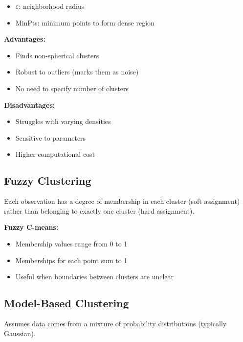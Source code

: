 \documentclass[
]{article}
\begin{document}
\begin{itemize}
\item
  \(\varepsilon\): neighborhood radius
\item
  MinPts: minimum points to form dense region
\end{itemize}

\textbf{Advantages:}

\begin{itemize}
\item
  Finds non-spherical clusters
\item
  Robust to outliers (marks them as noise)
\item
  No need to specify number of clusters
\end{itemize}

\textbf{Disadvantages:}

\begin{itemize}
\item
  Struggles with varying densities
\item
  Sensitive to parameters
\item
  Higher computational cost
\end{itemize}

\textbf{ }

\subsection{Fuzzy Clustering}

Each observation has a degree of membership in each cluster (soft
assignment) rather than belonging to exactly one cluster (hard
assignment).

\textbf{Fuzzy C-means:}

\begin{itemize}
\item
  Membership values range from 0 to 1
\item
  Memberships for each point sum to 1
\item
  Useful when boundaries between clusters are unclear
\end{itemize}

\textbf{ }

\subsection{Model-Based Clustering}

Assumes data comes from a mixture of probability distributions
(typically Gaussian).
\end{document}
